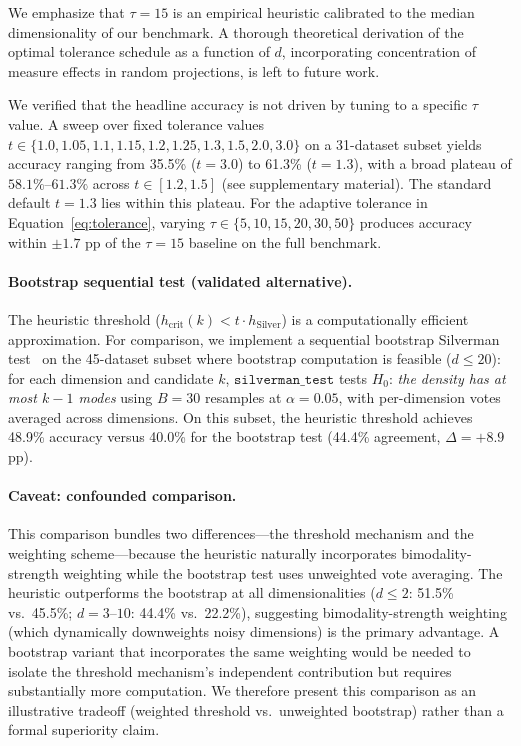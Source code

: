 \documentclass[journal]{IEEEtran}
\begin{document}
We emphasize that $\tau = 15$ is an empirical heuristic calibrated to the median dimensionality of our benchmark. A thorough theoretical derivation of the optimal tolerance schedule as a function of $d$, incorporating concentration of measure effects in random projections, is left to future work.

We verified that the headline accuracy is not driven by tuning to a specific $\tau$ value. A sweep over fixed tolerance values $t \in \{1.0, 1.05, 1.1, 1.15, 1.2, 1.25, 1.3, 1.5, 2.0, 3.0\}$ on a 31-dataset subset yields accuracy ranging from 35.5\% ($t=3.0$) to 61.3\% ($t=1.3$), with a broad plateau of $58.1\%$--$61.3\%$ across $t \in [1.2, 1.5]$ (see supplementary material). The standard default $t=1.3$ lies within this plateau. For the adaptive tolerance in Equation~\eqref{eq:tolerance}, varying $\tau \in \{5, 10, 15, 20, 30, 50\}$ produces accuracy within $\pm 1.7$ pp of the $\tau=15$ baseline on the full benchmark.

\paragraph{Bootstrap sequential test (validated alternative).}
The heuristic threshold ($h_{\mathrm{crit}}(k) < t \cdot h_{\mathrm{Silver}}$) is a computationally efficient approximation. For comparison, we implement a sequential bootstrap Silverman test~\cite{silverman1981using} on the 45-dataset subset where bootstrap computation is feasible ($d \leq 20$): for each dimension and candidate $k$, $\texttt{silverman\_test}$ tests $H_0$: \emph{the density has at most $k-1$ modes} using $B=30$ resamples at $\alpha = 0.05$, with per-dimension votes averaged across dimensions. On this subset, the heuristic threshold achieves 48.9\% accuracy versus 40.0\% for the bootstrap test (44.4\% agreement, $\Delta = +8.9$ pp).

\paragraph{Caveat: confounded comparison.}
This comparison bundles two differences---the threshold mechanism and the weighting scheme---because the heuristic naturally incorporates bimodality-strength weighting while the bootstrap test uses unweighted vote averaging. The heuristic outperforms the bootstrap at all dimensionalities ($d \leq 2$: 51.5\% vs.\ 45.5\%; $d = 3$--$10$: 44.4\% vs.\ 22.2\%), suggesting bimodality-strength weighting (which dynamically downweights noisy dimensions) is the primary advantage. A bootstrap variant that incorporates the same weighting would be needed to isolate the threshold mechanism's independent contribution but requires substantially more computation. We therefore present this comparison as an illustrative tradeoff (weighted threshold vs.\ unweighted bootstrap) rather than a formal superiority claim.
\end{document}
